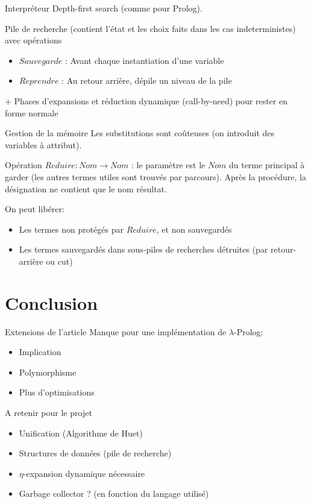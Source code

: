 \documentclass[aspectratio=169]{beamer}
\begin{document}
\begin{frame}{Interpréteur}
  Depth-first search (comme pour Prolog).

  Pile de recherche (contient l'état et les choix faits dans les cas indeterministes) avec opérations
  \begin{itemize}
    \item $Sauvegarde$ : Avant chaque instantiation d'une variable
    \item $Reprendre$ : Au retour arrière, dépile un niveau de la pile
  \end{itemize}

  + Phases d'expansions et réduction dynamique (call-by-need) pour rester en forme normale
\end{frame}

\begin{frame}{Gestion de la mémoire}
  Les substitutions sont coûteuses (on introduit des variables à attribut).

  Opération $Reduire : Nom \rightarrow Nom$ : le paramètre est le $Nom$ du terme principal à garder (les autres termes utiles sont trouvés par parcours). Après la procédure, la désignation ne contient que le nom résultat.

  On peut libérer:
  \begin{itemize}
    \item Les termes non protégés par $Reduire$, et non sauvegardés
    \item Les termes sauvegardés dans sous-piles de recherches détruites (par retour-arrière ou cut)
  \end{itemize}
\end{frame}

\section{Conclusion}

\begin{frame}{Extensions de l'article}
  Manque pour une implémentation de $\lambda$-Prolog:
  \begin{itemize}
    \item Implication
    \item Polymorphisme
    \item Plus d'optimisations
  \end{itemize}
\end{frame}

\begin{frame}{A retenir pour le projet}
  \begin{itemize}
    \item Unification (Algorithme de Huet)
    \item Structures de données (pile de recherche)
    \item $\eta$-expansion dynamique nécessaire
    \item Garbage collector ? (en fonction du langage utilisé)
  \end{itemize}
\end{frame}
\end{document}
